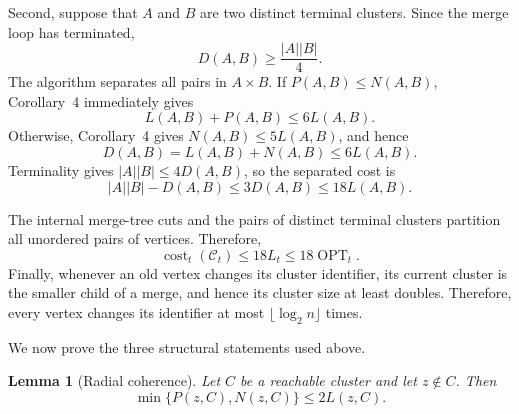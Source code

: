 \documentclass[11pt]{article}
\newtheorem{lemma}[theorem]{Lemma}
\newcommand{\cost}{\operatorname{cost}}
\newcommand{\OPT}{\operatorname{OPT}}
\begin{document}
Second, suppose that $A$ and $B$ are two distinct terminal clusters.  Since
the merge loop has terminated,
\[
    D(A,B)\ge\frac{|A||B|}{4}.
\]
The algorithm separates all pairs in $A\times B$.  If
$P(A,B)\le N(A,B)$, Corollary~4 immediately gives
\[
    L(A,B)+P(A,B)\le 6L(A,B).
\]
Otherwise, Corollary~4 gives $N(A,B)\le 5L(A,B)$, and hence
\[
    D(A,B)=L(A,B)+N(A,B)\le 6L(A,B).
\]
Terminality gives $|A||B|\le 4D(A,B)$, so the separated cost is
\[
    |A||B|-D(A,B)
    \le 3D(A,B)
    \le 18L(A,B).
\]

The internal merge-tree cuts and the pairs of distinct terminal clusters
partition all unordered pairs of vertices.  Therefore,
\[
    \cost_t(\mathcal C_t)
    \le 18L_t
    \le 18\OPT_t.
\]
Finally, whenever an old vertex changes its cluster identifier, its current
cluster is the smaller child of a merge, and hence its cluster size at least
doubles.  Therefore, every vertex changes its identifier at most
$\lfloor\log_2 n\rfloor$ times.

We now prove the three structural statements used above.

\begin{lemma}[Radial coherence]
\label{lem:radial-coherence}
Let $C$ be a reachable cluster and let $z\notin C$.  Then
\[
    \min\{P(z,C),N(z,C)\}\le 2L(z,C).
\]
\end{lemma}
\end{document}
